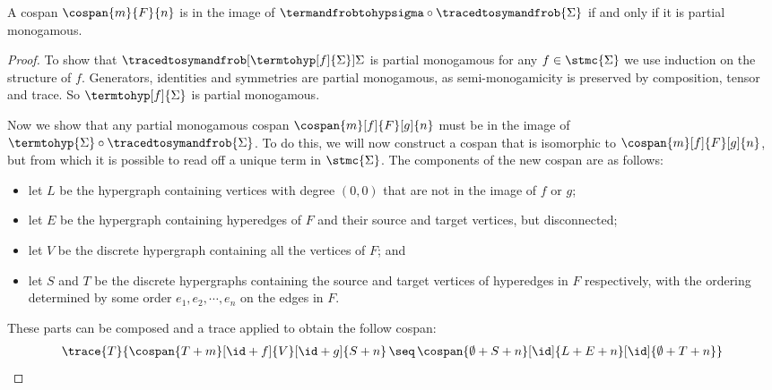 \begin{theorem}\label{thm:termtohyp-image}
    A cospan \(\cospan{m}{F}{n}\) is in the image of \(
        \termandfrobtohypsigma \circ \tracedtosymandfrob{\Sigma}\) if
    and only if it is partial monogamous.
\end{theorem}
\begin{proof}
    To show that \(\tracedtosymandfrob[\termtohyp[f]{\Sigma}]{\Sigma}\) is partial
    monogamous for any \(f \in \stmc{\Sigma}\) we use induction on the structure of
    \(f\).
    Generators, identities and symmetries are partial monogamous, as
    semi-monogamicity is preserved by composition, tensor and trace.
    So \(\termtohyp[f]{\Sigma}\) is partial monogamous.

    Now we show that any partial monogamous cospan \(
        \cospan{m}[f]{F}[g]{n}
    \)
    must be in the image of \(
        \termtohyp{\Sigma} \circ \tracedtosymandfrob{\Sigma}
    \).
    To do this, we will now construct a cospan that is isomorphic to
    \(\cospan{m}[f]{F}[g]{n}\), but from which it is possible to read off a
    unique term in \(\stmc{\Sigma}\).
    The components of the new cospan are as follows:
    \begin{itemize}
        \item let \(L\) be the hypergraph containing vertices with degree
                \((0,0)\) that are not in the image of \(f\) or \(g\);
        \item let \(E\) be the hypergraph containing hyperedges of \(F\) and
                their source and target vertices, but disconnected;
        \item let \(V\) be the discrete hypergraph containing all the
                vertices of \(F\); and
        \item let \(S\) and \(T\) be the discrete hypergraphs containing
                the source and target vertices of hyperedges in \(F\)
                respectively, with the ordering determined by some order
                \(e_1,e_2,\cdots,e_n\) on the edges in \(F\).
    \end{itemize}

    These parts can be composed and a trace applied to obtain the follow
    cospan:
    \begin{gather}
        \trace{T}{
            \cospan{T + m}[\id + f]{V}[\id + g]{S + n}
            \,\seq\,
            \cospan{\emptyset + S + n}[\id]{L + E + n}[\id]{\emptyset + T + n}
        }
        \label{gat:cospan}
    \end{gather}


\end{proof}
